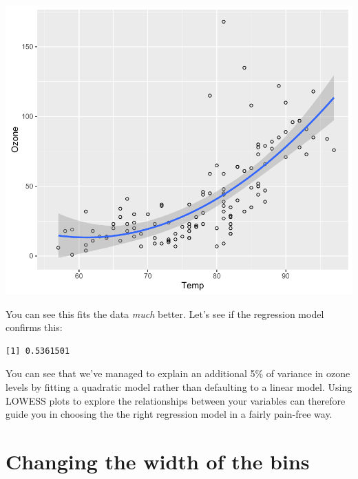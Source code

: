 \documentclass[]{article}
\newenvironment{Shaded}{\begin{snugshade}}{\end{snugshade}}
\newcommand{\KeywordTok}[1]{\textcolor[rgb]{0.13,0.29,0.53}{\textbf{{#1}}}}
\newcommand{\DataTypeTok}[1]{\textcolor[rgb]{0.13,0.29,0.53}{{#1}}}
\newcommand{\DecValTok}[1]{\textcolor[rgb]{0.00,0.00,0.81}{{#1}}}
\newcommand{\StringTok}[1]{\textcolor[rgb]{0.31,0.60,0.02}{{#1}}}
\newcommand{\NormalTok}[1]{{#1}}
\begin{document}
\begin{center}\includegraphics{12_Lowess_Plots_pdf/lowess_3-1} \end{center}

You can see this fits the data \emph{much} better. Let's see if the
regression model confirms this:

\begin{Shaded}
\end{Shaded}

\begin{verbatim}
[1] 0.5361501
\end{verbatim}

You can see that we've managed to explain an additional 5\% of variance
in ozone levels by fitting a quadratic model rather than defaulting to a
linear model. Using LOWESS plots to explore the relationships between
your variables can therefore guide you in choosing the the right
regression model in a fairly pain-free way.

\section{Changing the width of the
bins}\label{changing-the-width-of-the-bins}
\end{document}
